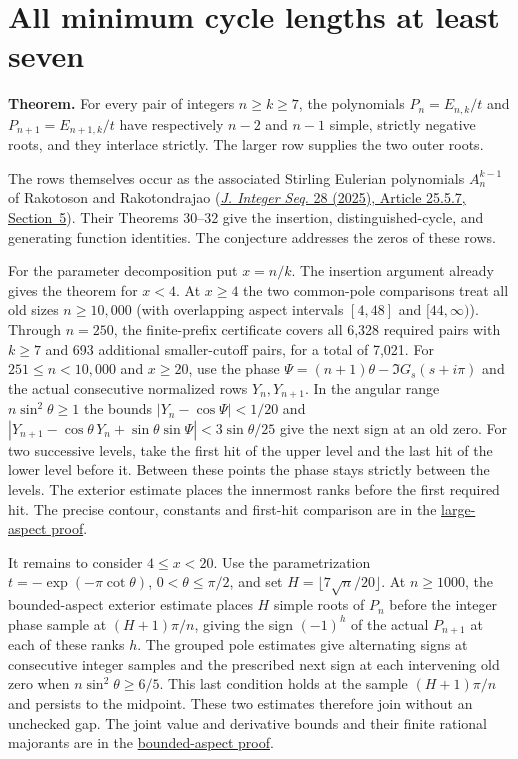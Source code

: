 \section{All minimum cycle lengths at least seven}
\label{sec:all-cutoffs}

\textbf{Theorem.}
For every pair of integers $n\ge k\ge7$, the polynomials $P_n=E_{n,k}/t$
and $P_{n+1}=E_{n+1,k}/t$ have respectively $n-2$ and $n-1$ simple,
strictly negative roots, and they interlace strictly.
The larger row supplies the two outer roots.

The rows themselves occur as the associated Stirling Eulerian polynomials
$A_n^{k-1}$ of Rakotoson and Rakotondrajao
(\href{https://cs.uwaterloo.ca/journals/JIS/VOL28/Rakotoson/rakoto12.html}
{\emph{J. Integer Seq.} 28 (2025), Article 25.5.7, Section~5}).
Their Theorems 30--32 give the insertion, distinguished-cycle, and generating
function identities. The conjecture addresses the zeros of these rows.

For the parameter decomposition put $x=n/k$. The insertion argument
already gives the theorem for $x<4$. At $x\ge4$ the two common-pole
comparisons treat all old sizes $n\ge10{,}000$ (with overlapping
aspect intervals $[4,48]$ and $[44,\infty)$). Through $n=250$, the
finite-prefix certificate covers all 6,328 required pairs with $k\ge7$
and 693 additional smaller-cutoff pairs, for a total of 7,021.
For $251\le n<10{,}000$ and $x\ge20$, use the phase
$\Psi=(n+1)\theta-\Im G_s(s+i\pi)$ and the actual consecutive normalized
rows $Y_n,Y_{n+1}$. In the angular range $n\sin^2\theta\ge1$ the
bounds $|Y_n-\cos\Psi|<1/20$ and
$|Y_{n+1}-\cos\theta\,Y_n+\sin\theta\sin\Psi|<3\sin\theta/25$
give the next sign at an old zero. For two successive levels, take the
first hit of the upper level and the last hit of the lower level before it.
Between these points the phase stays strictly between the levels.
The exterior estimate places the innermost ranks before the first required hit. The precise contour, constants and
first-hit comparison are in the
\href{https://github.com/ProgramComputer/open-math-research/tree/research/topics/long-cycle-excedances/aspect-20}{large-aspect proof}.

It remains to consider $4\le x<20$. Use the parametrization
$t=-\exp(-\pi\cot\theta)$, $0<\theta\le\pi/2$, and set
$H=\lfloor7\sqrt n/20\rfloor$. At $n\ge1000$, the bounded-aspect
exterior estimate places $H$ simple roots of $P_n$ before the integer
phase sample at $(H+1)\pi/n$, giving the sign $(-1)^h$ of the
actual $P_{n+1}$ at each of these ranks $h$. The grouped pole estimates
give alternating signs at consecutive integer samples and the prescribed
next sign at each intervening old zero when $n\sin^2\theta\ge6/5$.
This last condition holds at the sample $(H+1)\pi/n$ and persists to the
midpoint. These two estimates therefore join without an unchecked gap.
The joint value and derivative bounds and their finite rational
majorants are in the
\href{https://github.com/ProgramComputer/open-math-research/tree/research/topics/long-cycle-excedances/bounded-aspect}{bounded-aspect proof}.

